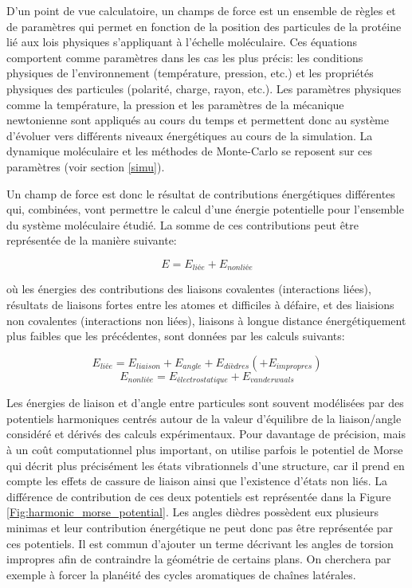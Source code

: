 D'un point de vue calculatoire, un champs de force est un ensemble de règles et de paramètres qui permet en fonction de la position des particules de la protéine lié aux lois physiques s'appliquant à l'échelle moléculaire. Ces équations comportent comme paramètres dans les cas les plus précis: les conditions physiques de l'environnement (température, pression, etc.) et les propriétés physiques des particules (polarité, charge, rayon, etc.). Les paramètres physiques comme la température, la pression et les paramètres de la mécanique newtonienne sont appliqués au cours du temps et permettent donc au système d'évoluer vers différents niveaux énergétiques au cours de la simulation. La dynamique moléculaire et les méthodes de Monte-Carlo se reposent sur ces paramètres (voir section \ref{simu}). 

Un champ de force est donc le résultat de contributions énergétiques différentes qui, combinées, vont permettre le calcul d'une énergie potentielle pour l'ensemble du système moléculaire étudié. La somme de ces contributions peut être représentée de la manière suivante:

$$E = E_{liée} + E_{nonliée}$$

où les énergies des contributions des liaisons covalentes (interactions liées), résultats de liaisons fortes entre les atomes et difficiles à défaire, et des liaisions non covalentes (interactions non liées), liaisons à longue distance énergétiquement plus faibles que les précédentes, sont données par les calculs suivants:

$$E_{liée} = E_{liaison} + E_{angle} + E_{dièdres} (+ E_{impropres})$$
$$E_{nonliée} = E_{électrostatique} + E_{vanderwaals}$$

Les énergies de liaison et d'angle entre particules sont souvent modélisées par des potentiels harmoniques centrés autour de la valeur d'équilibre de la liaison/angle considéré et dérivés des calculs expérimentaux. Pour davantage de précision, mais à un coût computationnel plus important, on utilise parfois le potentiel de Morse qui décrit plus précisément les états vibrationnels d'une structure, car il prend en compte les effets de cassure de liaison ainsi que l'existence d'états non liés. La différence de contribution de ces deux potentiels est représentée dans la Figure \ref{Fig:harmonic_morse_potential}. Les angles dièdres possèdent eux plusieurs minimas et leur contribution énergétique ne peut donc pas être représentée par ces potentiels. Il est commun d'ajouter un terme décrivant les angles de torsion impropres afin de contraindre la géométrie de certains plans. On cherchera par exemple à forcer la planéité des cycles aromatiques de chaînes latérales.

